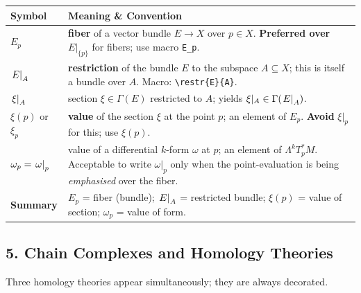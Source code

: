 \begin{longtable}{@{} p{4.5cm} p{9.5cm} @{}}
	\toprule
	\textbf{Symbol} & \textbf{Meaning \& Convention} \\
	\midrule
	\endhead
	
	$E_p$
	& \textbf{fiber} of a vector bundle $E\to X$ over $p\in X$.
	\textbf{Preferred over} $E|_{\{p\}}$ for fibers;
	use macro \texttt{E\_p}. \\[4pt]
	
	$\left.E\right|_{A}$
	& \textbf{restriction} of the bundle $E$ to the subspace
	$A\subseteq X$; this is itself a bundle over $A$.
	Macro: \texttt{\textbackslash restr\{E\}\{A\}}.\\[4pt]
	
	$\left.\xi\right|_{A}$
	& section $\xi\in\Gamma(E)$ restricted to $A$;
	yields $\xi|_A\in\Gamma(\left.E\right|_{A})$. \\[4pt]
	
	$\xi(p)$ or $\xi_p$
	& \textbf{value} of the section $\xi$ at the point $p$;
	an element of $E_p$. \textbf{Avoid} $\xi|_p$ for this; use $\xi(p)$.\\[4pt]
	
	$\omega_p = \left.\omega\right|_{p}$
	& value of a differential $k$-form $\omega$ at $p$;
	an element of $\Lambda^k T^*_p M$.
	Acceptable to write $\omega|_p$ only when
	the point-evaluation is being \emph{emphasised} over the fiber. \\[4pt]
	
	\textbf{Summary}
	& $E_p$ = fiber (bundle); \quad
	$\left.E\right|_{A}$ = restricted bundle; \quad
	$\xi(p)$ = value of section; \quad
	$\omega_p$ = value of form. \\[4pt]
	
	\bottomrule
\end{longtable}


\subsection*{5. Chain Complexes and Homology Theories}

\medskip\noindent
Three homology theories appear simultaneously; they are always decorated.

